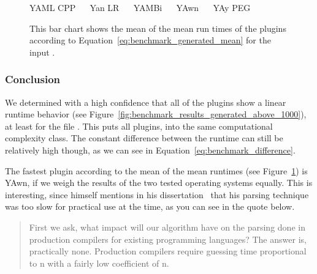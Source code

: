 \begin{figure}[H]
  \begin{bchart}[max=300, width=0.8\textwidth, unit=ms]





  \end{bchart}
  \begin{center}
  \vspace{-0.5cm}
     YAML CPP ~~
     Yan LR ~~
     YAMBi ~~
     YAwn ~~
     YAy PEG
  \vspace{-0.5cm}
  \end{center}
  \caption{This bar chart shows the mean of the mean run times of the plugins according to Equation~\ref{eq:benchmark_generated_mean} for the input \FileGenerated{}.}
  \label{fig:benchmark_generated_mean}
\end{figure}

\subsubsection{Conclusion}

We determined with a high confidence that all of the  plugins show a linear runtime behavior (see Figure~\ref{fig:benchmark_results_generated_above_1000}), at least for the file \FileGeneratedHundredThousand{}. This puts all plugins, into the same computational complexity class. The constant difference between the runtime can still be relatively high though, as we can see in Equation~\ref{eq:benchmark_difference}.

The fastest plugin according to the mean of the mean runtimes (see Figure~\ref{fig:benchmark_generated_mean}) is YAwn, if we weigh the results of the two tested operating systems equally. This is interesting, since \citeauthor{earley1970efficient} himself mentions in his dissertation~\cite[p. 122]{earley1970efficient} that his parsing technique was too slow for practical use at the time, as you can see in the quote below.

\begin{quote}
  First we ask, what impact will our algorithm have on the parsing done in production compilers for existing programming languages? The answer is, practically none. Production compilers require guessing time proportional to n with a fairly low coefficient of n.
\end{quote}

